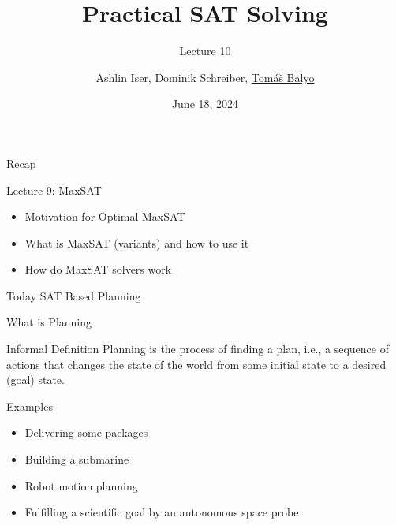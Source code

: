 \documentclass[t]{sdqbeamer}
\title[SAT Solving]{Practical SAT Solving}
\subtitle{Lecture 10}
\author{Ashlin Iser, Dominik Schreiber, \underline{Tom\'a\v{s} Balyo}}
\date{June 18, 2024}
\begin{document}
\begin{frame}
	\thispagestyle{empty}
	\titlepage
\end{frame}


\begin{frame}{Recap}
    \begin{block}{Lecture 9: MaxSAT}
		\begin{itemize}\setlength{\itemsep}{1ex}
			\item Motivation for Optimal MaxSAT
			\item What is MaxSAT (variants) and how to use it
			\item How do MaxSAT solvers work
		\end{itemize}
    \end{block}
	\begin{block}{Today}
        SAT Based Planning
	\end{block}
\end{frame}

\begin{frame}{What is Planning}
\begin{block}{Informal Definition}
Planning is the process of finding a plan, i.e., a sequence of actions that changes the
state of the world from some initial state to a desired (goal) state.
\end{block}
Examples
\begin{itemize}
	\item Delivering some packages
	\item Building a submarine
	\item Robot motion planning
	\item Fulfilling a scientific goal by an autonomous space probe
\end{itemize}
\end{frame}
\end{document}

